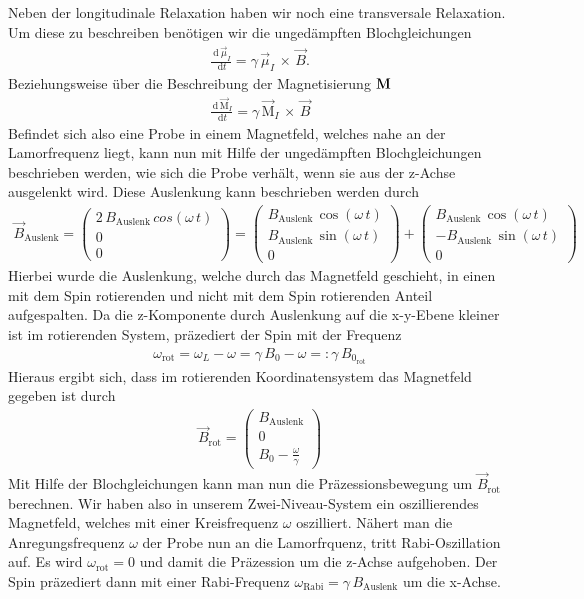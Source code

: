 \documentclass[10pt,twoside]{article}
\renewcommand{\d}{~\text{d}}
\renewcommand{\1}{^{-1}}
\renewcommand{\2}{^{-2}}
\newcommand{\3}{^{-3}}
\newcommand{\4}{^{-4}}
\newcommand{\5}{^{-5}}
\newcommand{\6}{^{-6}}
\newcommand{\7}{^{-7}}
\newcommand{\8}{^{-8}}
\newcommand{\9}{^{-9}}
\newcommand{\enifed}{\ensuremath{=\mathrel{\mathop:}}} %
\begin{document}
Neben der longitudinale Relaxation haben wir noch eine transversale Relaxation. Um diese zu beschreiben benötigen wir die ungedämpften Blochgleichungen
\begin{align*}
\frac{\d\,\vec{\mu}_I}{\d t} = \gamma\,\vec{\mu}_I\,\times\,\vec{B}{.}
\end{align*}
Beziehungsweise über die Beschreibung der Magnetisierung $\textbf{\text{M}}$
\begin{align*}
\frac{\d\,\vec{\text{M}}_I}{\d t} = \gamma\,\vec{\text{M}}_I\,\times\,\vec{B}
\end{align*}
Befindet sich also eine Probe in einem Magnetfeld, welches nahe an der Lamorfrequenz liegt, 
kann nun mit Hilfe der ungedämpften Blochgleichungen beschrieben werden, 
wie sich die Probe verhält, wenn sie aus der z-Achse ausgelenkt wird. Diese Auslenkung kann beschrieben werden durch 
\begin{align*}
\vec{B}_\text{Auslenk} = \begin{pmatrix}
2\,B_\text{Auslenk}\,cos(\omega\,t) \\ 
0 \\ 
0
\end{pmatrix} 
=
\begin{pmatrix}
B_\text{Auslenk}\,\cos(\omega\,t) \\ 
B_\text{Auslenk}\,\sin(\omega\,t) \\ 
0
\end{pmatrix} 
+
\begin{pmatrix}
B_\text{Auslenk}\,\cos(\omega\,t) \\ 
-B_\text{Auslenk}\,\sin(\omega\,t) \\ 
0
\end{pmatrix} 
\end{align*}
Hierbei wurde die Auslenkung, welche durch das Magnetfeld geschieht, 
in einen mit dem Spin rotierenden und nicht mit dem Spin rotierenden Anteil aufgespalten.  
Da die z-Komponente durch Auslenkung auf die x-y-Ebene kleiner ist im rotierenden System, präzediert der Spin mit der Frequenz
\begin{align*}
\omega_\text{rot} = \omega_L-\omega = \gamma\,B_0-\omega \enifed \gamma\,B_{0_\text{rot}}
\end{align*}
Hieraus ergibt sich, dass im rotierenden Koordinatensystem das Magnetfeld gegeben ist durch
\begin{align*}
\vec{B}_\text{rot} = 
\begin{pmatrix}
B_\text{Auslenk} \\
0 \\
B_0- \frac{\omega}{\gamma}
\end{pmatrix}
\end{align*}
Mit Hilfe der Blochgleichungen kann man nun die Präzessionsbewegung um $\vec{B}_\text{rot}$ berechnen. 
Wir haben also in unserem Zwei-Niveau-System ein oszillierendes Magnetfeld, 
welches mit einer Kreisfrequenz $\omega$ oszilliert.
Nähert man die Anregungsfrequenz $\omega$ der Probe nun an die Lamorfrquenz, tritt Rabi-Oszillation auf. 
Es wird $\omega_\text{rot}=0 $ und damit die Präzession um die z-Achse aufgehoben.
Der Spin präzediert dann mit einer Rabi-Frequenz $\omega_\text{Rabi} = \gamma\,B_\text{Auslenk}$ um die x-Achse.
\end{document}
